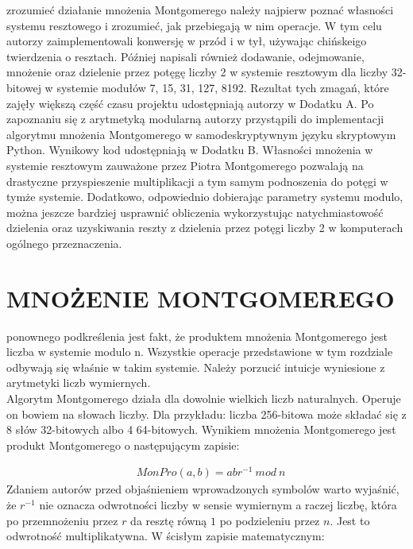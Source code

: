 \documentclass[10pt,journal,compsoc]{IEEEtran}
\begin{document}
 zrozumieć działanie mnożenia Montgomerego należy najpierw poznać własności systemu resztowego i zrozumieć, jak przebiegają w nim operacje. W tym celu autorzy zaimplementowali konwersję w przód i w tył, używając chińskeigo twierdzenia o resztach. Później napisali również dodawanie, odejmowanie, mnożenie oraz dzielenie przez potęgę liczby 2 w systemie resztowym dla liczby 32-bitowej w systemie modułów 7, 15, 31, 127, 8192. Rezultat tych zmagań, które zajęły większą część czasu projektu udostępniają autorzy w Dodatku A. Po zapoznaniu się z arytmetyką modularną autorzy przystąpili do implementacji algorytmu mnożenia Montgomerego w samodeskryptywnym języku skryptowym Python. Wynikowy kod udostępniają w Dodatku B. Własności mnożenia w systemie resztowym zauważone przez Piotra Montgomerego pozwalają na drastyczne przyspieszenie multiplikacji a tym samym podnoszenia do potęgi w tymże systemie. Dodatkowo, odpowiednio dobierając parametry systemu modulo, można jeszcze bardziej usprawnić obliczenia wykorzystując natychmiastowość dzielenia oraz uzyskiwania reszty z dzielenia przez potęgi liczby 2 w komputerach ogólnego przeznaczenia.

\section{MNOŻENIE MONTGOMEREGO}
 ponownego podkreślenia jest fakt, że produktem mnożenia Montgomerego jest liczba w systemie modulo n. Wszystkie operacje przedstawione w tym rozdziale odbywają się właśnie w takim systemie. Należy porzucić intuicje wyniesione z arytmetyki liczb wymiernych.\\
Algorytm Montgomerego działa dla dowolnie wielkich liczb naturalnych. Operuje on bowiem na słowach liczby. Dla przykładu: liczba 256-bitowa może składać się z 8 słów 32-bitowych albo 4 64-bitowych. Wynikiem mnożenia Montgomerego jest produkt Montgomerego o następującym zapisie:

\begin{align*}
  &MonPro(a,b) = abr^{-1}\ mod\ n
\end{align*}
\noindent
Zdaniem autorów przed objaśnieniem wprowadzonych symbolów warto wyjaśnić, że $r^{-1}$ nie oznacza odwrotności liczby w sensie wymiernym a raczej liczbę, która po przemnożeniu przez $r$ da resztę równą $1$ po podzieleniu przez $n$. Jest to odwrotność multiplikatywna. W ścisłym zapisie matematycznym:
\end{document}
